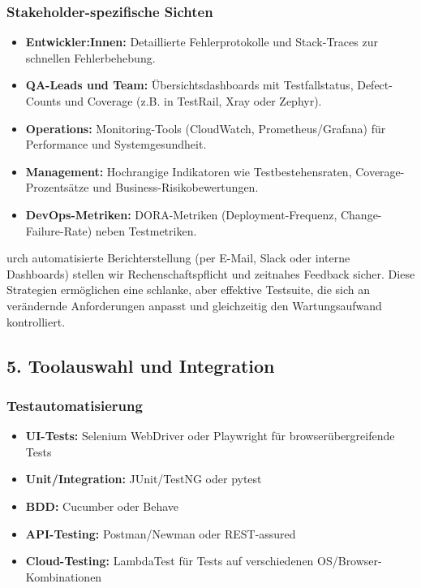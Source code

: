 \subsubsection{Stakeholder-spezifische Sichten}
\begin{itemize}
    \item \textbf{Entwickler:Innen:} Detaillierte Fehlerprotokolle und Stack-Traces zur schnellen Fehlerbehebung.
    \item \textbf{QA-Leads und Team:} Übersichtsdashboards mit Testfallstatus, Defect-Counts und Coverage (z.B. in TestRail, Xray oder Zephyr).
    \item \textbf{Operations:} Monitoring-Tools (CloudWatch, Prometheus/Grafana) für Performance und Systemgesundheit.
    \item \textbf{Management:} Hochrangige Indikatoren wie Testbestehensraten, Coverage-Prozentsätze und Business-Risikobewertungen.
    \item \textbf{DevOps-Metriken:} DORA-Metriken (Deployment-Frequenz, Change-Failure-Rate) neben Testmetriken.
\end{itemize}
urch automatisierte Berichterstellung (per E-Mail, Slack oder interne Dashboards) stellen wir Rechenschaftspflicht und zeitnahes Feedback sicher.
Diese Strategien ermöglichen eine schlanke, aber effektive Testsuite, die sich an verändernde Anforderungen anpasst und gleichzeitig den Wartungsaufwand kontrolliert.
\subsection{5. Toolauswahl und Integration}
\subsubsection{Testautomatisierung}
\begin{itemize}
    \item \textbf{UI-Tests:}  Selenium WebDriver oder Playwright für browserübergreifende Tests
    \item \textbf{Unit/Integration:} JUnit/TestNG oder pytest
    \item \textbf{BDD:} Cucumber oder Behave
    \item \textbf{API-Testing:} Postman/Newman oder REST-assured
    \item \textbf{Cloud-Testing:} LambdaTest für Tests auf verschiedenen OS/Browser-Kombinationen
\end{itemize}

